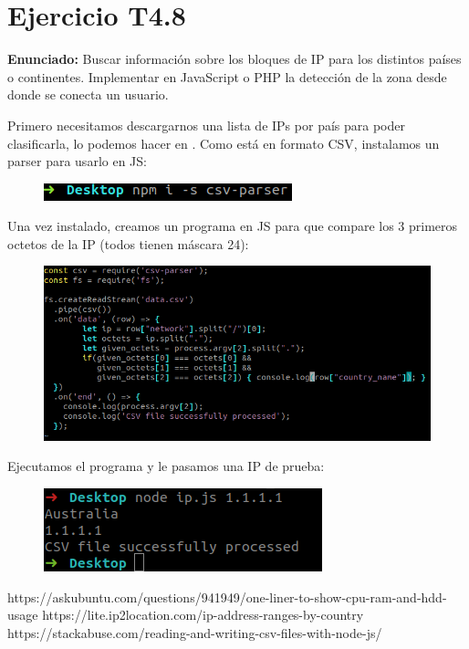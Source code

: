\documentclass[12pt]{article}
\begin{document}
\section{Ejercicio T4.8}
\textbf{Enunciado:} Buscar información sobre los bloques de IP para los distintos países o continentes. Implementar en JavaScript o PHP la detección de la zona desde donde se conecta un usuario.

Primero necesitamos descargarnos una lista de IPs por país para poder clasificarla, lo podemos hacer en \cite{d}. Como está en formato CSV, instalamos un parser para usarlo en JS:

\begin{figure}[H]
  \center
  \includegraphics[scale=0.5]{img/4.png}
\end{figure}

Una vez instalado, creamos un programa en JS para que compare los 3 primeros octetos de la IP (todos tienen máscara 24):

\begin{figure}[H]
  \center
  \includegraphics[scale=0.5]{img/5.png}
\end{figure}

Ejecutamos el programa y le pasamos una IP de prueba:

\begin{figure}[H]
  \center
  \includegraphics[scale=0.5]{img/6.png}
\end{figure}

\begin{thebibliography}{9}
https://askubuntu.com/questions/941949/one-liner-to-show-cpu-ram-and-hdd-usage
https://lite.ip2location.com/ip-address-ranges-by-country
https://stackabuse.com/reading-and-writing-csv-files-with-node-js/
\end{thebibliography}

\end{document}
